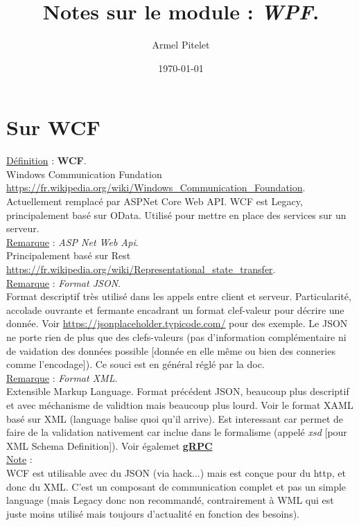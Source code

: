 \documentclass[a4paper,12pt,twoside]{article}
\title{Notes sur le module : \textit{WPF}.}
\author{Armel Pitelet}
\date{\today}
\newcommand{\urlcolor}{magenta}  %
\newcommand{\keycolor}{purple} %
\newcommand{\rem}[2]{\noindent\underline{Remarque} : \textit{#1}.\\ \indent #2}
\newcommand{\note}[1]{\noindent\underline{Note} : \\ \indent #1}
\newcommand{\defi}[2]{\noindent\underline{Définition} : \textbf{#1}.\\ \indent #2}
\newcommand{\keyref}[2]{\hypersetup{urlcolor=\keycolor} \href{#1}{\textbf{#2}}\hypersetup{urlcolor=\urlcolor}}
\begin{document}
\maketitle
\tableofcontents


\section{Sur WCF}

\defi{WCF}{Windows Communication Fundation \url{https://fr.wikipedia.org/wiki/Windows_Communication_Foundation}. Actuellement remplacé par ASPNet Core Web API. WCF est Legacy, principalement basé sur OData. Utilisé pour mettre en place des services sur un serveur.}\\

\rem{ASP Net Web Api}{Principalement basé sur Rest \url{https://fr.wikipedia.org/wiki/Representational_state_transfer}.}\\

\rem{Format JSON}{Format descriptif très utilisé dans les appels entre client et serveur. Particularité, accolade ouvrante et fermante encadrant un format clef-valeur pour décrire une donnée. Voir \url{https://jsonplaceholder.typicode.com/} pour des exemple. Le JSON ne porte rien de plus que des clefs-valeurs (pas d'information complémentaire ni de vaidation des données possible [donnée en elle même ou bien des conneries comme l'encodage]). Ce souci est en général réglé par la doc.}\\

\rem{Format XML}{Extensible Markup Language. Format précédent JSON, beaucoup plus descriptif et avec méchanisme de validtion mais beaucoup plus lourd. Voir le format XAML basé sur XML (language balise quoi qu'il arrive). Est interessant car permet de faire de la validation nativement car inclue dans le formalisme (appelé \textit{xsd} [pour XML Schema Definition]). Voir égalemet \keyref{https://fr.wikipedia.org/wiki/GRPC}{gRPC}}\\

\note{WCF est utilisable avec du JSON (via hack...) mais est conçue pour du http, et donc du XML. C'est un composant de communication complet et pas un simple language (mais Legacy donc non recommandé, contrairement à WML qui est juste moins utilisé mais toujours d'actualité en fonction des besoins).}\\
\end{document}
